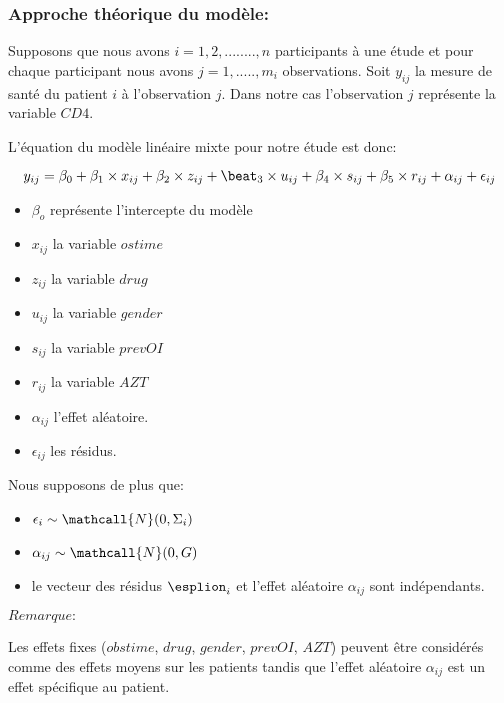 \documentclass{article}
\begin{document}
\subsubsection{Approche théorique du modèle:}

Supposons que nous avons $i = 1,2,........,n$ participants à une étude et pour chaque participant nous avons $j=1,.....,m_i$  observations. 
Soit $y_{ij}$ la mesure de santé du patient $i$ à l'observation $j$. Dans notre cas l'observation $j$ représente la variable $CD4$.

L'équation du modèle linéaire mixte pour notre étude est donc:

\[y_{ij} = \beta_0 + \beta_1 \times x_{ij} + \beta_2 \times z_{ij} +\beat_3 \times u_{ij} + \beta_4 \times s_{ij} + \beta_5 \times r_{ij} + \alpha_{ij} + \epsilon_{ij}\]

\vspace{0.1cm}
\begin{itemize}
    \item $\beta_o$ représente l'intercepte du modèle
    \item $x_{ij}$ la variable $ostime$
    \item $z_{ij}$  la variable $drug$
    \item $u_{ij}$ la variable $gender$
    \item $s_{ij}$ la variable $prevOI$
    \item $r_{ij}$ la variable $AZT$
    \item $\alpha_{ij}$ l'effet aléatoire.
    \item $\epsilon_{ij}$ les résidus.
\end{itemize}

Nous supposons de plus que:
\begin{itemize}
    \item $\epsilon_i \sim \mathcall{N}(0,\Sigma_i)$
    \item $\alpha_{ij} \sim \mathcall{N}(0,G)$ 
    \item le vecteur des résidus $\esplion_{i}$ et l'effet aléatoire $\alpha_{ij}$ sont indépendants.
\end{itemize}


\vspace{1cm}
$Remarque:$

\vspace{0.1cm}
Les effets fixes ($obstime$, $drug$, $gender$, $prevOI$, $AZT$) peuvent être considérés comme des effets moyens sur les patients tandis que l'effet aléatoire $\alpha_{ij}$ est un effet spécifique au patient.
\end{document}
